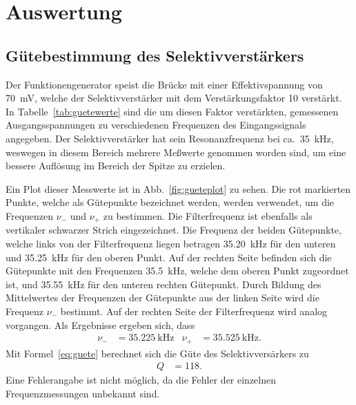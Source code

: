 
\section{Auswertung}
%
\subsection{Gütebestimmung des Selektivverstärkers}
%
Der Funktionengenerator speist die Brücke mit einer Effektivspannung von
\SI{70}{\milli\volt}, welche der Selektivverstärker mit dem
Verstärkungsfaktor 10 verstärkt.  In Tabelle~\ref{tab:guetewerte} sind
die um diesen Faktor verstärkten, gemessenen Ausgangsspannungen zu
verschiedenen Frequenzen des Eingangssignals angegeben. Der
Selektivverstärker hat sein Resonanzfrequenz bei
ca.~\SI{35}{\kilo\hertz}, weswegen in diesem Bereich mehrere Meßwerte
genommen worden sind, um eine bessere Auflösung im Bereich der Spitze zu
erzielen.

Ein Plot dieser Messwerte ist in Abb.~\ref{fig:gueteplot} zu sehen.  Die
rot markierten Punkte, welche als Gütepunkte bezeichnet werden, werden
verwendet, um die Frequenzen $\nu_-$ und $\nu_+$ zu bestimmen.  Die
Filterfrequenz ist ebenfalls als vertikaler schwarzer Strich
eingezeichnet.  Die Frequenz der beiden Gütepunkte, welche links von der
Filterfrequenz liegen betragen \SI{35.20}{\kilo\hertz} für den unteren
und \SI{35.25}{\kilo\hertz} für den oberen Punkt.  Auf der rechten Seite
befinden sich die Gütepunkte mit den Frequenzen \SI{35.5}{\kilo\hertz},
welche dem oberen Punkt zugeordnet ist, und \SI{35.55}{\kilo\hertz} für
den unteren rechten Gütepunkt.  Durch Bildung des Mittelwertes der
Frequenzen der Gütepunkte aus der linken Seite wird die Frequenz $\nu_-$
bestimmt.  Auf der rechten Seite der Filterfrequenz wird analog
vorgangen.  Als Ergebnisse ergeben sich, dass
%
\begin{align*}
  \nu_- &= \SI{35.225}{\kilo\hertz} &
  \nu_+ &= \SI{35.525}{\kilo\hertz}.
\end{align*}
%
Mit Formel~\eqref{eq:guete} berechnet sich die Güte des
Selektivversärkers zu
%
\begin{align*}
  Q &= \num{118}.
\end{align*}
%
Eine Fehlerangabe ist nicht möglich, da die Fehler der einzelnen 
Frequenzmessungen unbekannt sind.

